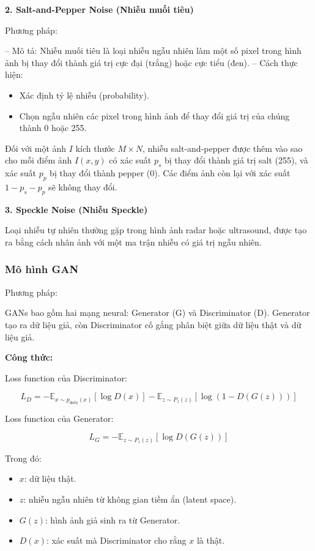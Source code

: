 \documentclass[12pt]{report}
\begin{document}
\textbf{2. Salt-and-Pepper Noise (Nhiễu muối tiêu)}  

Phương pháp:  

– Mô tả: Nhiễu muối tiêu là loại nhiễu ngẫu nhiên làm một số pixel trong hình ảnh bị thay đổi thành giá trị cực đại (trắng) hoặc cực tiểu (đen).  
– Cách thực hiện:
\begin{itemize}
    \item Xác định tỷ lệ nhiễu (probability).
    \item Chọn ngẫu nhiên các pixel trong hình ảnh để thay đổi giá trị của chúng thành 0 hoặc 255.
\end{itemize}

Đối với một ảnh \( I \) kích thước \( M \times N \), nhiễu salt-and-pepper được thêm vào sao cho mỗi điểm ảnh \( I(x, y) \) có xác suất \( p_s \) bị thay đổi thành giá trị salt (255), và xác suất \( p_p \) bị thay đổi thành pepper (0). Các điểm ảnh còn lại với xác suất \( 1 - p_s - p_p \) sẽ không thay đổi.

\textbf{3. Speckle Noise (Nhiễu Speckle)}  

Loại nhiễu tự nhiên thường gặp trong hình ảnh radar hoặc ultrasound, được tạo ra bằng cách nhân ảnh với một ma trận nhiễu có giá trị ngẫu nhiên.

\subsubsection{Mô hình GAN}

Phương pháp:  

GANs bao gồm hai mạng neural: Generator (G) và Discriminator (D). Generator tạo ra dữ liệu giả, còn Discriminator cố gắng phân biệt giữa dữ liệu thật và dữ liệu giả.

\textbf{Công thức:}

Loss function của Discriminator:

\[
L_D = -\mathbb{E}_{x \sim p_{data}(x)}[\log D(x)] - \mathbb{E}_{z \sim P_z(z)}[\log(1 - D(G(z)))]
\]

Loss function của Generator:

\[
L_G = -\mathbb{E}_{z \sim P_z(z)}[\log D(G(z))]
\]

Trong đó:
\begin{itemize}
    \item \( x \): dữ liệu thật.
    \item \( z \): nhiễu ngẫu nhiên từ không gian tiềm ẩn (latent space).
    \item \( G(z) \): hình ảnh giả sinh ra từ Generator.
    \item \( D(x) \): xác suất mà Discriminator cho rằng \( x \) là thật.
\end{itemize}
\end{document}
